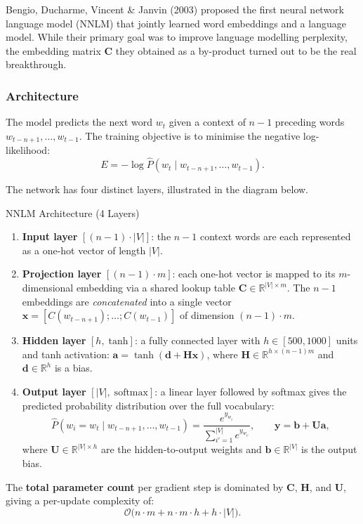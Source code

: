 \documentclass[11pt,a4paper]{article}
\begin{document}
Bengio, Ducharme, Vincent \& Janvin (2003) proposed the first neural network language model (NNLM) that jointly learned word embeddings and a language model. While their primary goal was to improve language modelling perplexity, the embedding matrix $\mathbf{C}$ they obtained as a by-product turned out to be the real breakthrough.

\subsubsection{Architecture}

The model predicts the next word $w_t$ given a context of $n-1$ preceding words $w_{t-n+1}, \ldots, w_{t-1}$. The training objective is to minimise the negative log-likelihood:
\[
  E = -\log \hat{P}(w_t \mid w_{t-n+1}, \ldots, w_{t-1}).
\]

The network has four distinct layers, illustrated in the diagram below.

\begin{thmbox}{NNLM Architecture (4 Layers)}
\begin{enumerate}
  \item \textbf{Input layer} $[(n-1)\cdot|V|]$: the $n-1$ context words are each represented as a one-hot vector of length $|V|$.
  \item \textbf{Projection layer} $[(n-1)\cdot m]$: each one-hot vector is mapped to its $m$-dimensional embedding via a shared lookup table $\mathbf{C} \in \mathbb{R}^{|V|\times m}$. The $n-1$ embeddings are \emph{concatenated} into a single vector $\mathbf{x} = [C(w_{t-n+1}); \ldots; C(w_{t-1})]$ of dimension $(n-1)\cdot m$.
  \item \textbf{Hidden layer} $[h,\;\text{tanh}]$: a fully connected layer with $h \in [500, 1000]$ units and tanh activation: $\mathbf{a} = \tanh(\mathbf{d} + \mathbf{H}\mathbf{x})$, where $\mathbf{H} \in \mathbb{R}^{h \times (n-1)m}$ and $\mathbf{d} \in \mathbb{R}^h$ is a bias.
  \item \textbf{Output layer} $[|V|,\;\text{softmax}]$: a linear layer followed by softmax gives the predicted probability distribution over the full vocabulary:
  \[
    \hat{P}(w_i = w_t \mid w_{t-n+1},\ldots,w_{t-1}) = \frac{e^{y_{w_i}}}{\sum_{i'=1}^{|V|}e^{y_{w_{i'}}}},
    \qquad \mathbf{y} = \mathbf{b} + \mathbf{U}\mathbf{a},
  \]
  where $\mathbf{U} \in \mathbb{R}^{|V|\times h}$ are the hidden-to-output weights and $\mathbf{b} \in \mathbb{R}^{|V|}$ is the output bias.
\end{enumerate}
The \textbf{total parameter count} per gradient step is dominated by $\mathbf{C}$, $\mathbf{H}$, and $\mathbf{U}$, giving a per-update complexity of:
\[
  \mathcal{O}\bigl(n \cdot m + n \cdot m \cdot h + h \cdot |V|\bigr).
\]
\end{thmbox}
\end{document}
